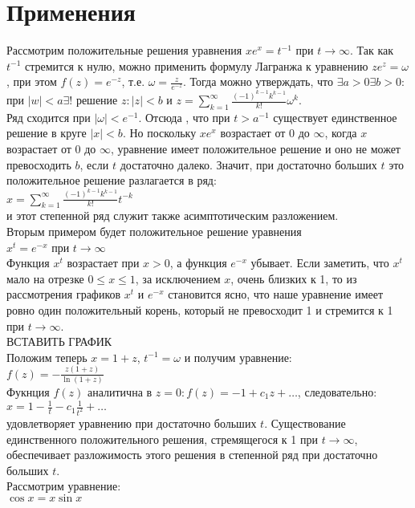 \documentclass{report}
\begin{document}
\section{Применения}
Рассмотрим положительные решения уравнения $xe^{x}=t^{-1}$ при $t\to\infty$. Так как $t^{-1}$ стремится к нулю, можно применить формулу Лагранжа к уравнению $ze^{z}=\omega$, при этом
$f(z)=e^{-z}$, т.е. $\omega=\frac{z}{e^{-z}}$. Тогда можно утверждать, что $\exists{a>0}\exists{b>0}:$ при $|w|<a\exists!$ решение $z:|z|<b$ и $z=\sum_{k=1}^{\infty}\frac{(-1)^{k-1}k^{k-1}}{k!}\omega^{k}$. \\
Ряд сходится при $|\omega|<e^{-1}$. Отсюда , что при $t>a^{-1}$ существует единственное решение в круге $|x|<b$. Но поскольку $xe^{x}$ возрастает от $0$ до $\infty$, когда $x$ возрастает
от $0$ до $\infty$, уравнение имеет положительное решение и оно не может превосходить $b$, если $t$ достаточно далеко. Значит, при достаточно больших $t$ это положительное решение разлагается
в ряд: \\
$x=\sum_{k=1}^{\infty}\frac{(-1)^{k-1}k^{k-1}}{k!}t^{-k}$ \\
и этот степенной ряд служит также асимптотическим разложением.\\
Вторым примером будет положительное решение уравнения \\
$x^{t}=e^{-x}$ при $t\to\infty$ \\
Функция $x^{t}$ возрастает при $x>0$, а функция $e^{-x}$ убывает. Если заметить, что $x^{t}$ мало на отрезке $0\leq x\leq 1$, за исключением $x$, очень близких к 1, то из рассмотрения графиков $x^{t}$ и $e^{-x}$
становится ясно, что наше уравнение имеет ровно один положительный корень, который не превосходит 1 и стремится к 1 при $t\to\infty$. \\
ВСТАВИТЬ ГРАФИК \\
Положим теперь $x=1+z$, $t^{-1}=\omega$ и получим уравнение: \\
$f(z)=-\frac{z(1+z)}{\ln(1+z)}$ \\
Фукнция $f(z)$ аналитична в $z=0: f(z)=-1+c_1z+\dots$, следовательно: \\
$x=1-\frac{1}{t}-c_1\frac{1}{t^{2}}+\dots$\\
удовлетворяет уравнению при достаточно больших $t$. Существование единственного положительного решения, стремящегося к 1 при $t\to\infty$, обеспечивает разложимость этого решения в
степенной ряд при достаточно больших $t$. \\
Рассмотрим уравнение: \\
$\cos{x}=x\sin{x}$\\
\end{document}

